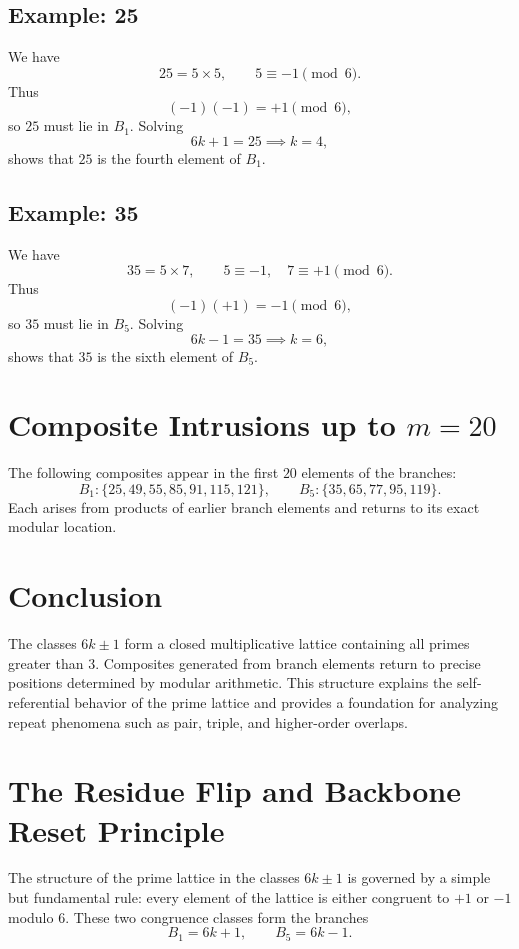 \documentclass[12pt]{article}
\begin{document}
\subsection{Example: 25}
We have
\[
25 = 5 \times 5, \qquad 5 \equiv -1 \pmod{6}.
\]
Thus
\[
(-1)(-1) = +1 \pmod{6},
\]
so $25$ must lie in $B_1$. Solving
\[
6k+1 = 25 \implies k = 4,
\]
shows that $25$ is the fourth element of $B_1$.

\subsection{Example: 35}
We have
\[
35 = 5 \times 7, \qquad 5 \equiv -1, \quad 7 \equiv +1 \pmod{6}.
\]
Thus
\[
(-1)(+1) = -1 \pmod{6},
\]
so $35$ must lie in $B_5$. Solving
\[
6k-1 = 35 \implies k = 6,
\]
shows that $35$ is the sixth element of $B_5$.

\section{Composite Intrusions up to $m=20$}
The following composites appear in the first $20$ elements of the branches:
\[
B_1: \{25, 49, 55, 85, 91, 115, 121\}, \qquad
B_5: \{35, 65, 77, 95, 119\}.
\]
Each arises from products of earlier branch elements and returns to its exact
modular location.

\section{Conclusion}
The classes $6k \pm 1$ form a closed multiplicative lattice containing all primes
greater than $3$. Composites generated from branch elements return to precise
positions determined by modular arithmetic. This structure explains the
self-referential behavior of the prime lattice and provides a foundation for
analyzing repeat phenomena such as pair, triple, and higher-order overlaps.

\section{The Residue Flip and Backbone Reset Principle}

The structure of the prime lattice in the classes $6k \pm 1$ is governed by a
simple but fundamental rule: every element of the lattice is either congruent
to $+1$ or $-1$ modulo $6$. These two congruence classes form the branches
\[
B_1 = 6k+1, \qquad B_5 = 6k-1.
\]
\end{document}
